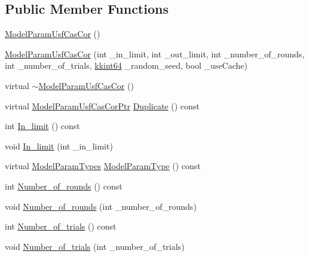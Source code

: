 \subsection*{Public Member Functions}
\begin{DoxyCompactItemize}
\item 
\hyperlink{class_k_k_m_l_l_1_1_model_param_usf_cas_cor_a47ae2b35d8068831ed700cb90bb72234}{Model\+Param\+Usf\+Cas\+Cor} ()
\item 
\hyperlink{class_k_k_m_l_l_1_1_model_param_usf_cas_cor_aedaf1350e92780b9ab6161017b24bfb9}{Model\+Param\+Usf\+Cas\+Cor} (int \+\_\+in\+\_\+limit, int \+\_\+out\+\_\+limit, int \+\_\+number\+\_\+of\+\_\+rounds, int \+\_\+number\+\_\+of\+\_\+trials, \hyperlink{namespace_k_k_b_aa3486b1c5ea9162b3b020c69f72826eb}{kkint64} \+\_\+random\+\_\+seed, bool \+\_\+use\+Cache)
\item 
virtual \hyperlink{class_k_k_m_l_l_1_1_model_param_usf_cas_cor_a447d86e5d4c89e7d61ba2d1544211d38}{$\sim$\+Model\+Param\+Usf\+Cas\+Cor} ()
\item 
virtual \hyperlink{class_k_k_m_l_l_1_1_model_param_usf_cas_cor_a0f72ca8339557710b72336348855b34d}{Model\+Param\+Usf\+Cas\+Cor\+Ptr} \hyperlink{class_k_k_m_l_l_1_1_model_param_usf_cas_cor_a0c9f88854d1cbacae903f952fdf928ad}{Duplicate} () const 
\item 
int \hyperlink{class_k_k_m_l_l_1_1_model_param_usf_cas_cor_a59520f81b783491aa85c7f87c6041542}{In\+\_\+limit} () const 
\item 
void \hyperlink{class_k_k_m_l_l_1_1_model_param_usf_cas_cor_a2e234d3bd48ff01910a09a827147f6ae}{In\+\_\+limit} (int \+\_\+in\+\_\+limit)
\item 
virtual \hyperlink{class_k_k_m_l_l_1_1_model_param_a5984a5fe225fdbe8e40fb5ec746a42d0}{Model\+Param\+Types} \hyperlink{class_k_k_m_l_l_1_1_model_param_usf_cas_cor_af9c15c4ef23972e7fea1a649cb0b9200}{Model\+Param\+Type} () const 
\item 
int \hyperlink{class_k_k_m_l_l_1_1_model_param_usf_cas_cor_a6f4c7baa6de3af2725b8d475095f54de}{Number\+\_\+of\+\_\+rounds} () const 
\item 
void \hyperlink{class_k_k_m_l_l_1_1_model_param_usf_cas_cor_af168ce29ac5a40b393727bf41bd180e9}{Number\+\_\+of\+\_\+rounds} (int \+\_\+number\+\_\+of\+\_\+rounds)
\item 
int \hyperlink{class_k_k_m_l_l_1_1_model_param_usf_cas_cor_ae2d0f967087242bfc16b1e07096af177}{Number\+\_\+of\+\_\+trials} () const 
\item 
void \hyperlink{class_k_k_m_l_l_1_1_model_param_usf_cas_cor_a1fd0ac5e26204190159cc6350c46c4a2}{Number\+\_\+of\+\_\+trials} (int \+\_\+number\+\_\+of\+\_\+trials)

\end{DoxyCompactItemize}
